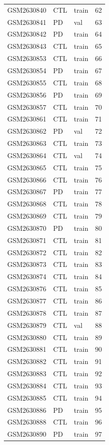 \begin{footnotesize}
\begin{longtable}{llll}
GSM2630840 & CTL & train & 62 \\
GSM2630841 & PD & val & 63 \\
GSM2630842 & PD & train & 64 \\
GSM2630843 & CTL & train & 65 \\
GSM2630853 & CTL & train & 66 \\
GSM2630854 & PD & train & 67 \\
GSM2630855 & CTL & train & 68 \\
GSM2630856 & PD & train & 69 \\
GSM2630857 & CTL & train & 70 \\
GSM2630861 & CTL & train & 71 \\
GSM2630862 & PD & val & 72 \\
GSM2630863 & CTL & train & 73 \\
GSM2630864 & CTL & val & 74 \\
GSM2630865 & CTL & train & 75 \\
GSM2630866 & CTL & train & 76 \\
GSM2630867 & PD & train & 77 \\
GSM2630868 & CTL & train & 78 \\
GSM2630869 & CTL & train & 79 \\
GSM2630870 & PD & train & 80 \\
GSM2630871 & CTL & train & 81 \\
GSM2630872 & CTL & train & 82 \\
GSM2630873 & CTL & train & 83 \\
GSM2630874 & CTL & train & 84 \\
GSM2630876 & CTL & train & 85 \\
GSM2630877 & CTL & train & 86 \\
GSM2630878 & CTL & train & 87 \\
GSM2630879 & CTL & val & 88 \\
GSM2630880 & CTL & train & 89 \\
GSM2630881 & CTL & train & 90 \\
GSM2630882 & CTL & train & 91 \\
GSM2630883 & CTL & train & 92 \\
GSM2630884 & CTL & train & 93 \\
GSM2630885 & CTL & train & 94 \\
GSM2630886 & PD & train & 95 \\
GSM2630888 & CTL & train & 96 \\
GSM2630890 & PD & train & 97 \\

\end{longtable}
\end{footnotesize}
